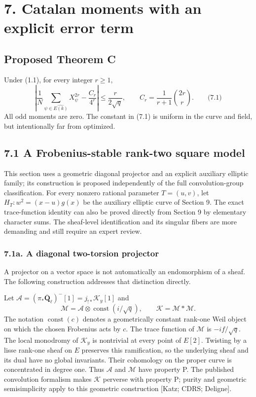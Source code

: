 \documentclass[
  11pt,
  a4paper,
]{article}
\newcommand{\Q}{\overline{\mathbf Q}_{\ell}}
\newcommand{\const}{\operatorname{const}}
\newcommand{\A}{\mathcal A}
\newcommand{\M}{\mathcal M}
\begin{document}
\section{7. Catalan moments with an explicit error
term}\label{catalan-moments-with-an-explicit-error-term}

\subsection{Proposed Theorem C}\label{proposed-theorem-c}

Under (1.1), for every integer \(r\ge1\), \[
\boxed{
\left|\frac1N\sum_{\psi\in\widehat{E(k)}}X_\psi^{2r}
-\frac{C_r}{4^r}\right|
\le\frac{r}{2\sqrt q},
\qquad C_r=\frac1{r+1}\binom{2r}{r}.
}
\qquad \text{(7.1)}
\] All odd moments are zero. The constant in (7.1) is uniform in the
curve and field, but intentionally far from optimized.

\subsection{7.1 A Frobenius-stable rank-two square model}

This section uses a geometric diagonal projector and an explicit auxiliary
elliptic family; its construction is proposed independently of the full
convolution-group classification. For every nonzero rational parameter $T=(u,v)$, let
$H_T:w^2=(x-u)g(x)$ be the auxiliary elliptic curve of Section 9.
The exact trace-function identity can also be proved directly
from Section 9 by elementary character sums.
The sheaf-level identification and its singular fibers are more demanding
and still require an expert review.

\subsubsection{7.1a. A diagonal two-torsion projector}

A projector on a vector space is not automatically an endomorphism of a sheaf. The following construction addresses that distinction directly.

Let $\A=(\pi_*\Q)^-[1]=j_{!*}\mathcal K_y[1]$ and
\begin{equation}
 \M=\A\otimes\const(i/\sqrt q),\qquad \mathcal K=\M*\M.
\end{equation}
The notation $\const(c)$ denotes a geometrically constant rank-one Weil object on which the chosen Frobenius acts by $c$. The trace function of $\M$ is $-if/\sqrt q$. The local monodromy of $\mathcal K_y$ is nontrivial at every point of $E[2]$. Twisting by a lisse rank-one sheaf on $E$ preserves this ramification, so the underlying sheaf and its dual have no global invariants. Their cohomology on the proper curve is concentrated in degree one. Thus $\A$ and $\M$ have property P. The published convolution formalism makes $\mathcal K$ perverse with property P; purity and geometric semisimplicity apply to this geometric construction [Katz; CDRS; Deligne].
\end{document}
